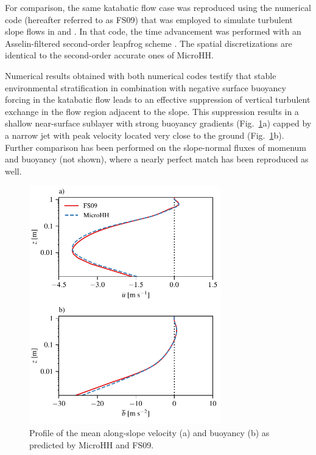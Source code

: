 \documentclass[gmd,manuscript]{copernicus}
\begin{document}
For comparison, the same katabatic flow case was reproduced using the numerical code (hereafter referred to as FS09) that was employed to simulate turbulent slope flows in \citet{Shapiro2008} and \citet{Fedorovich2009}. In that code, the time advancement was performed with an Asselin-filtered second-order leapfrog scheme \citep{Durran2013}. The spatial discretizations are identical to the second-order accurate ones of MicroHH. 

Numerical results obtained with both numerical codes testify that stable environmental stratification in combination with negative surface buoyancy forcing in the katabatic flow leads to an effective suppression of vertical turbulent exchange in the flow region adjacent to the slope. This suppression results in a shallow near-surface sublayer with strong buoyancy gradients (Fig.~\ref{fig:katabatic}a) capped by a narrow jet with peak velocity located very close to the ground (Fig.~\ref{fig:katabatic}b). Further comparison has been performed on the slope-normal fluxes of momenum and buoyancy (not shown), where a nearly perfect match has been reproduced as well.

\begin{figure}[t]
	\vspace*{2mm}
	\begin{center}
		\includegraphics[width=8.3cm]{figs/katabatic.pdf}
	\end{center}
	\caption{Profile of the mean along-slope velocity (a) and buoyancy (b) as predicted by MicroHH and FS09.}
	\label{fig:katabatic}
\end{figure}
\end{document}
